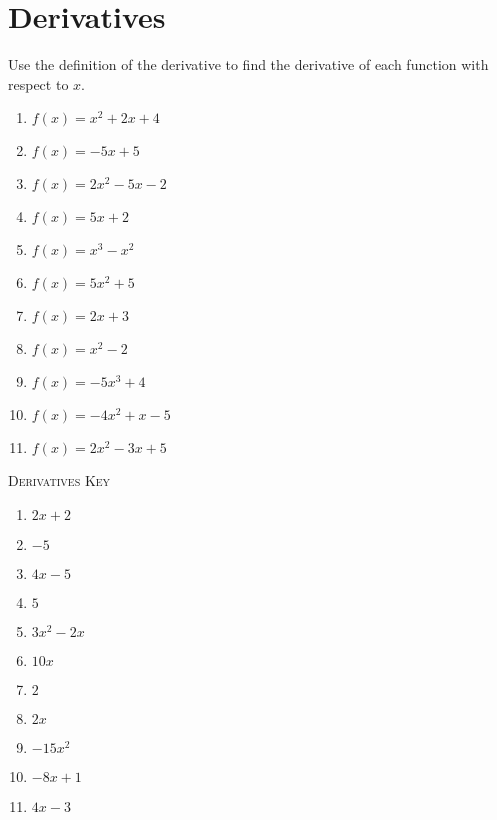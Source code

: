 \chapter{Derivatives}

Use the definition of the derivative to find the derivative of each function with respect to $x$.

\begin{enumerate}
	\item $f(x) = x^2 + 2x + 4$
	\item $f(x) = -5x + 5$
	\item $f(x) = 2x^2 - 5x - 2$
	\item $f(x) = 5x+2$
	\item $f(x) = x^3 - x^2$
	\item $f(x) = 5x^2 + 5$
	\item $f(x) = 2x + 3$
	\item $f(x) = x^2 - 2$
	\item $f(x) = -5x^3 + 4$
	\item $f(x) = -4x^2 + x - 5$
	\item $f(x) = 2x^2 - 3x + 5$
\end{enumerate}

\newpage

\textsc{Derivatives Key}

\begin{enumerate}
	\item $2x + 2$
	\item $-5$
	\item $4x - 5$
	\item $5$
	\item $3x^2 - 2x$
	\item $10x$
	\item $2$
	\item $2x$
	\item $-15x^2$
	\item $-8x + 1$
	\item $4x - 3$
\end{enumerate}